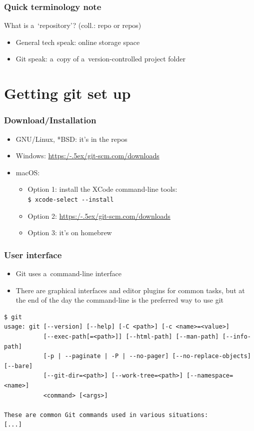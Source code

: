 \documentclass[12pt]{beamer}
\begin{document}
\begin{frame}
  \frametitle{Quick terminology note}

  \begin{block}{What is a~`repository'?}
    {\footnotesize{}(coll.: \alert{repo} or \alert{repos})}
    \begin{itemize}
      \item General tech speak:
        online storage space
      \item Git speak:
        a~copy of a~version-controlled project folder
    \end{itemize}
  \end{block}
\end{frame}


\section{Getting git set up}

\begin{frame}[fragile]
  \frametitle{Download/Installation}

  \begin{itemize}
    \item GNU/Linux, *BSD: it's in the repos
    \item Windows: \href{https://git-scm.com/downloads}{https:/\kern-.5ex/git-scm.com/downloads}
    \item macOS:
      \begin{itemize}
        \item Option 1: install the XCode command-line tools:\\
          \verb"$ xcode-select --install"
        \item Option 2: \href{https://git-scm.com/downloads}{https:/\kern-.5ex/git-scm.com/downloads}
        \item Option 3: it's on homebrew
      \end{itemize}
  \end{itemize}
\end{frame}

\begin{frame}[fragile]
  \frametitle{User interface}

  \begin{itemize}
    \item Git uses a~command-line interface
    \item There are graphical interfaces and editor plugins for common tasks,
      but at the end of the day the command-line is the preferred way to use git
  \end{itemize}
  {\footnotesize{}%
    \begin{verbatim}
$ git
usage: git [--version] [--help] [-C <path>] [-c <name>=<value>]
           [--exec-path[=<path>]] [--html-path] [--man-path] [--info-path]
           [-p | --paginate | -P | --no-pager] [--no-replace-objects] [--bare]
           [--git-dir=<path>] [--work-tree=<path>] [--namespace=<name>]
           <command> [<args>]

These are common Git commands used in various situations:
[...]
    \end{verbatim}
  }
\end{frame}
\end{document}
